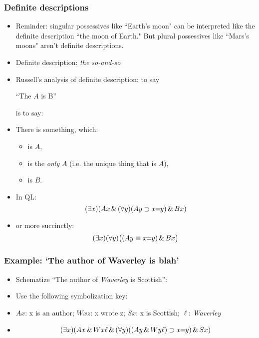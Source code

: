 \begin{frame}
    \frametitle{Definite descriptions}

\begin{itemize}[<+->]

\item Reminder: singular possessives like ``Earth's moon" can be interpreted like the definite description ``the moon of Earth." But plural possessives like ``Mars's moons" aren't definite descriptions.

\item Definite description: \emph{the so-and-so}
\item Russell's analysis of definite description: to say\\[1ex]
\centerline{``The $A$ is B''}
is to say:
\item There is something, which:
\begin{itemize}[<+->]
\item is $A$,
\item is the \emph{only} $A$ (i.e. the unique thing that is $A$),
\item is $B$.
\end{itemize}
\item In QL:
\[
(\exists x)(Ax \,\&\, (\forall y)(Ay \supset x\!\!=\!\!y) \,\&\, Bx)
\]
\item or more succinctly:
\[
(\exists x)(\forall y)\big((Ay \equiv x\!\!=\!\!y) \,\&\, Bx\big)
\]
\end{itemize}
\end{frame}



\begin{frame}
\frametitle{Example: `The author of Waverley is blah'}

\begin{itemize}[<+->]

\item Schematize ``The author of \textit{Waverley} is Scottish'':

\item Use the following symbolization key:

\item $Ax$: x is an author; $Wxz$: x wrote z; $Sx$: x is Scottish; $\ell$: \textit{Waverley}
\item[]
\[
(\exists x)(Ax \,\&\, Wx\ell \,\&\, (\forall y)( (Ay \,\&\, Wy\ell) \supset x\!\!=\!\!y) \,\&\, Sx)
\]


\end{itemize}
\end{frame}


